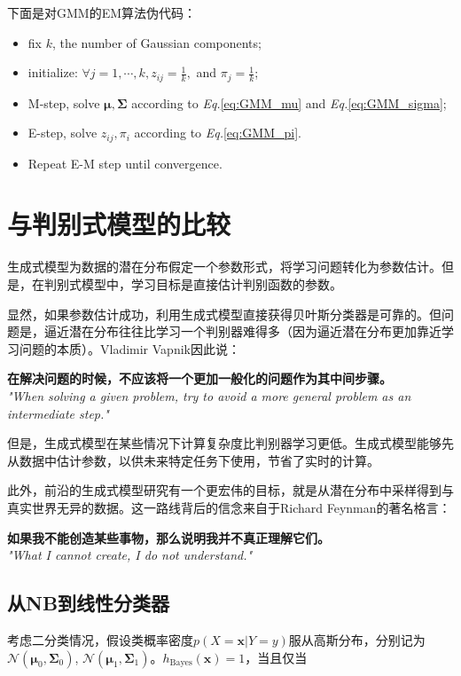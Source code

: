 \documentclass{article}
\begin{document}
	下面是对GMM的EM算法伪代码：
	
	\begin{minipage}{.9\linewidth}
    \begin{itemize}
	\item fix $k$, the number of Gaussian components;
	\item initialize: $\forall j=1,\cdots,k, z_{ij}=\frac{1}{k},$ and $\pi_j=\frac{1}{k}$;
	\item M-step, solve $\bm{\mu}, \bm{\Sigma}$ according to \textit{Eq.}\ref{eq:GMM_mu} and \textit{Eq.}\ref{eq:GMM_sigma};
	\item E-step, solve $z_{ij},\pi_i$ according to \textit{Eq.}\ref{eq:GMM_pi}.
	\item Repeat E-M step until convergence.
	\end{itemize}
  	\end{minipage}

		
\section{与判别式模型的比较}
	\label{sec:final}
	生成式模型为数据的潜在分布假定一个参数形式，将学习问题转化为参数估计。但是，在判别式模型中，学习目标是直接估计判别函数的参数。
	
	显然，如果参数估计成功，利用生成式模型直接获得贝叶斯分类器是可靠的。但问题是，逼近潜在分布往往比学习一个判别器难得多（因为逼近潜在分布更加靠近学习问题的本质）。Vladimir Vapnik因此说：
	\begin{center}
	\textbf{在解决问题的时候，不应该将一个更加一般化的问题作为其中间步骤。}
	\\ \textit{"When solving a given problem, try to avoid a more general problem as an intermediate step."}
	\end{center}

	但是，生成式模型在某些情况下计算复杂度比判别器学习更低。生成式模型能够先从数据中估计参数，以供未来特定任务下使用，节省了实时的计算。
	
	此外，前沿的生成式模型研究有一个更宏伟的目标，就是从潜在分布中采样得到与真实世界无异的数据。这一路线背后的信念来自于Richard Feynman的著名格言：	
	\begin{center}
	\textbf{如果我不能创造某些事物，那么说明我并不真正理解它们。}
	\\ \textit{"What I cannot create, I do not understand."}
	\end{center}

	\subsection{从NB到线性分类器}
	考虑二分类情况，假设类概率密度$p(X=\bm{x}|Y=y)$服从高斯分布，分别记为$\mathcal{N}(\bm{\mu}_0,\bm{\Sigma}_0)$, $\mathcal{N}(\bm{\mu}_1,\bm{\Sigma}_1)$。$h_{\mathrm{Bayes}}(\bm{x})=1$，当且仅当
	
\end{document}
